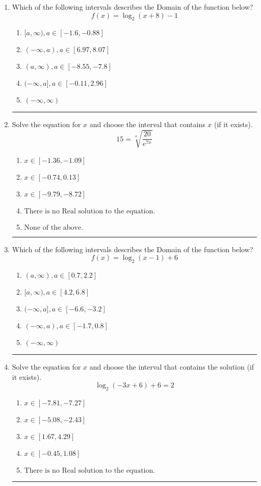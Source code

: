 \documentclass[14pt]{extbook}
\newcommand{\litem}[1]{\item#1\hspace*{-1cm}\rule{\textwidth}{0.4pt}}
\begin{document}
\begin{enumerate}
{\begin{enumerate}[label=\Alph*.]
\end{enumerate} }
\litem{
Which of the following intervals describes the Domain of the function below?\[ f(x) = \log_2{(x+8)}-1 \]\begin{enumerate}[label=\Alph*.]
\item \( [a, \infty), a \in [-1.6, -0.88] \)
\item \( (-\infty, a), a \in [6.97, 8.07] \)
\item \( (a, \infty), a \in [-8.55, -7.8] \)
\item \( (-\infty, a], a \in [-0.11, 2.96] \)
\item \( (-\infty, \infty) \)

\end{enumerate} }
\litem{
 Solve the equation for $x$ and choose the interval that contains $x$ (if it exists).\[  15 = \sqrt[4]{\frac{20}{e^{7x}}} \]\begin{enumerate}[label=\Alph*.]
\item \( x \in [-1.36, -1.09] \)
\item \( x \in [-0.74, 0.13] \)
\item \( x \in [-9.79, -8.72] \)
\item \( \text{There is no Real solution to the equation.} \)
\item \( \text{None of the above.} \)

\end{enumerate} }
\litem{
Which of the following intervals describes the Domain of the function below?\[ f(x) = \log_2{(x-1)}+6 \]\begin{enumerate}[label=\Alph*.]
\item \( (a, \infty), a \in [0.7, 2.2] \)
\item \( [a, \infty), a \in [4.2, 6.8] \)
\item \( (-\infty, a], a \in [-6.6, -3.2] \)
\item \( (-\infty, a), a \in [-1.7, 0.8] \)
\item \( (-\infty, \infty) \)

\end{enumerate} }
\litem{
Solve the equation for $x$ and choose the interval that contains the solution (if it exists).\[ \log_{2}{(-3x+6)}+6 = 2 \]\begin{enumerate}[label=\Alph*.]
\item \( x \in [-7.81, -7.27] \)
\item \( x \in [-5.08, -2.43] \)
\item \( x \in [1.67, 4.29] \)
\item \( x \in [-0.45, 1.08] \)
\item \( \text{There is no Real solution to the equation.} \)


\end{enumerate}}
\end{enumerate}
\end{document}
